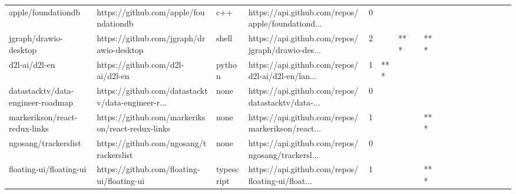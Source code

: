 \begin{tabular}{llllrlllllllllllll}
apple/foundationdb                                 &              https://github.com/apple/foundationdb &               c++ &  https://api.github.com/repos/apple/foundationd... &       0 &         &        &           &                &                 &        &           &           &          &          &       &              &          \\
jgraph/drawio-desktop                              &           https://github.com/jgraph/drawio-desktop &             shell &  https://api.github.com/repos/jgraph/drawio-des... &       2 &         &    *** &           &            *** &                 &        &           &           &          &          &       &              &          \\
d2l-ai/d2l-en                                      &                   https://github.com/d2l-ai/d2l-en &            python &  https://api.github.com/repos/d2l-ai/d2l-en/lan... &       1 &     *** &        &           &                &                 &        &           &           &          &          &       &              &          \\
datastacktv/data-engineer-roadmap                  &  https://github.com/datastacktv/data-engineer-r... &              none &  https://api.github.com/repos/datastacktv/data-... &       0 &         &        &           &                &                 &        &           &           &          &          &       &              &          \\
markerikson/react-redux-links                      &   https://github.com/markerikson/react-redux-links &              none &  https://api.github.com/repos/markerikson/react... &       1 &         &        &           &            *** &                 &        &           &           &          &          &       &              &          \\
ngosang/trackerslist                               &            https://github.com/ngosang/trackerslist &              none &  https://api.github.com/repos/ngosang/trackersl... &       0 &         &        &           &                &                 &        &           &           &          &          &       &              &          \\
floating-ui/floating-ui                            &         https://github.com/floating-ui/floating-ui &        typescript &  https://api.github.com/repos/floating-ui/float... &       1 &         &        &           &            *** &                 &        &           &           &          &          &       &              &          \\

\end{tabular}
